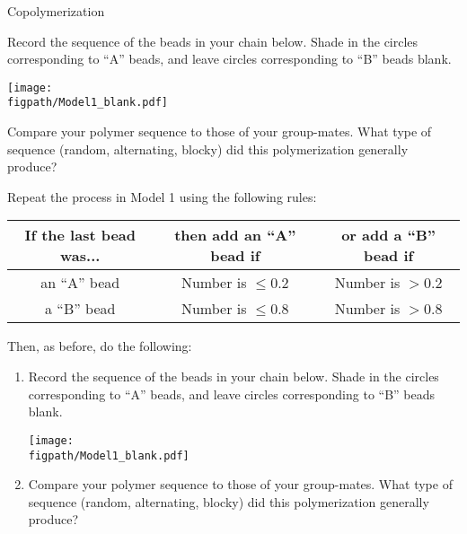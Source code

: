 \begin{activity}{Copolymerization}
\begin{model}
\end{model}


\begin{ctqs}

	\question Record the sequence of the beads in your chain below.  Shade in the circles corresponding to ``A'' beads, and leave circles corresponding to ``B'' beads blank.
	
		\vspace{6pt}
		\centerline{\texttt{[image: \\figpath/Model1\_blank.pdf]}}
	
	\question Compare your polymer sequence to those of your group-mates.  What type of sequence (random, alternating, blocky) did this polymerization generally produce?
		
		\begin{solution}[1.25in]
		\end{solution}
	
	\question Repeat the process in Model 1 using the following rules:	\begin{center}
					\renewcommand{\arraystretch}{1.5}
					\begin{tabular}{|c|c|c|}
						\hline
						\textbf{If the last bead was...} &  \textbf{then add an ``A'' bead if} & \textbf{or add a ``B'' bead if}\\\hline
						 an ``A'' bead & Number is $\leq 0.2$ & Number is $> 0.2$ \\
						 a ``B'' bead & Number is $\leq 0.8$ & Number is $> 0.8$ \\\hline
					\end{tabular}
					\end{center}
	
		Then, as before, do the following:
		\begin{enumerate}
			\item Record the sequence of the beads in your chain below.  Shade in the circles corresponding to ``A'' beads, and leave circles corresponding to ``B'' beads blank.
	
		\vspace{6pt}
		\centerline{\texttt{[image: \\figpath/Model1\_blank.pdf]}}
	
			\item Compare your polymer sequence to those of your group-mates.  What type of sequence (random, alternating, blocky) did this polymerization generally produce?
			
				\begin{solution}[1.25in]
				\end{solution}
				

\end{enumerate}
\end{ctqs}
\end{activity}
